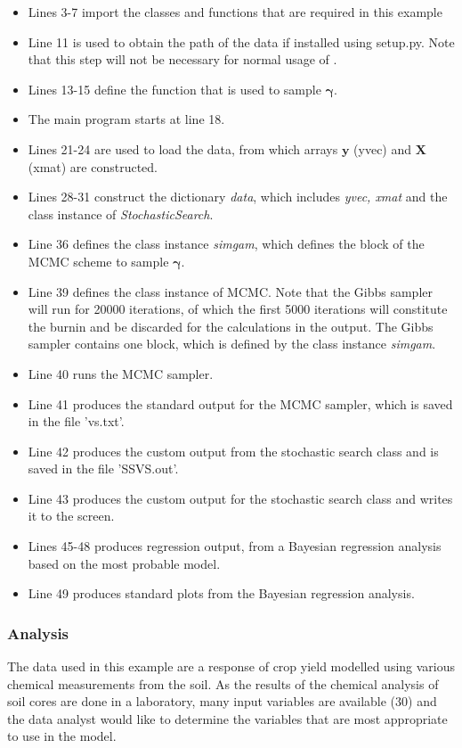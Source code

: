 \documentclass[article]{jss}
\begin{document}
\begin{itemize}
\item Lines 3-7 import the classes and functions that are required in this
example
\item Line 11 is used to obtain the path of the data if installed using
setup.py. Note that this step will not be necessary for normal usage
of .
\item Lines 13-15 define the function that is used to sample $\bm{\gamma}.$
\item The main program starts at line 18.
\item Lines 21-24 are used to load the data, from which arrays $\bm{y}$
(yvec) and $\bm{X}$ (xmat) are constructed.
\item Lines 28-31 construct the dictionary \emph{data}, which includes \emph{yvec,
xmat} and the class instance of \emph{StochasticSearch}.
\item Line 36 defines the class instance \emph{simgam}, which defines the
block of the MCMC scheme to sample $\bm{\gamma}$.
\item Line 39 defines the class instance of MCMC. Note that the Gibbs sampler
will run for 20000 iterations, of which the first 5000 iterations
will constitute the burnin and be discarded for the calculations in
the output. The Gibbs sampler contains one block, which is defined
by the class instance \emph{simgam}.
\item Line 40 runs the MCMC sampler.
\item Line 41 produces the standard output for the MCMC sampler, which is
saved in the file 'vs.txt'.
\item Line 42 produces the custom output from the stochastic search class
and is saved in the file 'SSVS.out'.
\item Line 43 produces the custom output for the stochastic search class
and writes it to the screen.
\item Lines 45-48 produces regression output, from a Bayesian regression
analysis based on the most probable model.
\item Line 49 produces standard plots from the Bayesian regression analysis.
\end{itemize}

\subsubsection{Analysis}

The data used in this example are a response of crop yield modelled
using various chemical measurements from the soil. As the results of
the chemical analysis of soil cores are done in a laboratory, many
input variables are available (30) and the data analyst would like to
determine the variables that are most appropriate to use in the model.
\end{document}
